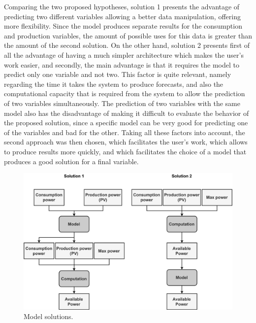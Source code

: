 Comparing the two proposed hypotheses, solution 1 presents the advantage of predicting two different variables allowing a better data manipulation, offering more flexibility. Since the model produces separate results for the consumption and production variables, the amount of possible uses for this data is greater than the amount of the second solution. On the other hand, solution 2 presents first of all the advantage of having a much simpler architecture which makes the user's work easier, and secondly, the main advantage is that it requires the model to predict only one variable and not two. This factor is quite relevant, namely regarding the time it takes the system to produce forecasts, and also the computational capacity that is required from the system to allow the prediction of two variables simultaneously. The prediction of two variables with the same model also has the disadvantage of making it difficult to evaluate the behavior of the proposed solution, since a specific model can be very good for predicting one of the variables and bad for the other. 
Taking all these factors into account, the second approach was then chosen, which facilitates the user's work, which allows to produce results more quickly, and which facilitates the choice of a model that produces a good solution for a final variable.



\begin{figure}[h!]
    \centering
    \begin{center}
    \includegraphics[width=1\textwidth]{Images/Available.png}
    \caption{Model solutions.}
    \label{avsol}
    \end{center}
\end{figure}



